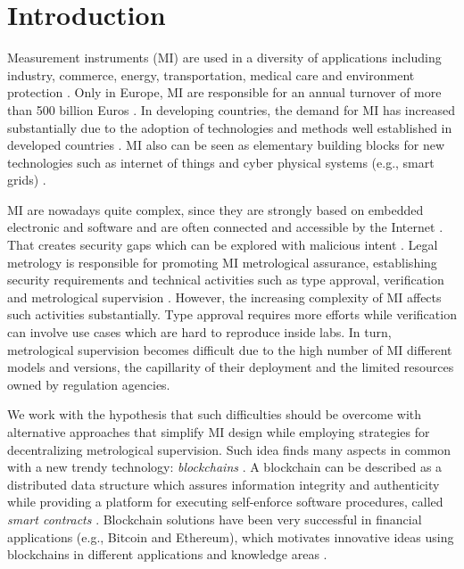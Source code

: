 \documentclass[journal]{IEEEtran} %
\begin{document}


%
\IEEEpeerreviewmaketitle

\section{Introduction}
Measurement instruments (MI) are used in a diversity of applications including industry, commerce, energy, transportation, medical care and environment protection \cite{RodriguesFilho2015}. Only in Europe, MI are responsible for an annual turnover of more than 500 billion Euros \cite{Esche2015}. In developing countries, the demand for MI has increased substantially due to the adoption of technologies and methods well established in developed countries \cite{RodriguesFilho2015}. MI also can be seen as elementary building blocks for new technologies such as internet of things and cyber physical systems (e.g., smart grids) \cite{RodriguesFilho2015,Esche2015,Camara2012,Boccardo2014,Peters2015,Oppermann2016}. 

MI are nowadays quite complex, since they are strongly based on embedded electronic and software and are often connected and accessible by the Internet \cite{Esche2015,Camara2012}. That creates security gaps which can be explored with malicious intent \cite{Boccardo2014,Peters2015}. Legal metrology is responsible for promoting MI metrological assurance, establishing security requirements and technical activities such as type approval, verification and metrological supervision \cite{RodriguesFilho2015}. However, the increasing complexity of MI affects such activities substantially. Type approval requires more efforts while verification can involve use cases which are hard to reproduce inside labs. In turn, metrological supervision becomes difficult due to the high number of MI different models and versions, the capillarity of their deployment and the limited resources owned by regulation agencies.

We work with the hypothesis that such difficulties should be overcome with alternative approaches that simplify MI design while employing strategies for decentralizing metrological supervision. Such idea finds many aspects in common with a new trendy technology: \emph{blockchains} \cite{Zheng2017}. A blockchain can be described as a distributed data structure which assures information integrity and authenticity while providing a platform for executing self-enforce software procedures, called \emph{smart contracts} \cite{Christidis2016}. Blockchain solutions have been very successful in financial applications (e.g., Bitcoin and Ethereum), which motivates innovative ideas using blockchains in different applications and knowledge areas \cite{Zheng2017,Christidis2016}.
\end{document}
